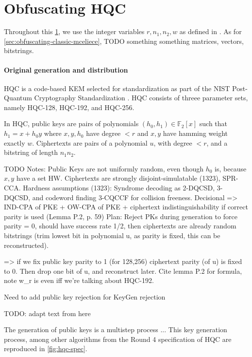 \section{Obfuscating HQC} \label{sec:obfuscating-hqc}

Throughout this \cref{sec:obfuscating-hqc}, we use the integer variables $r, n_1, n_2, w$ as defined in \cite{NISTPQC-R4:HQC22}.
As for \cref{sec:obfuscating-classic-mceliece}, TODO something something matrices, vectors, bitstrings.

\paragraph{Original generation and distribution}
HQC is a code-based KEM selected for standardization as part of the NIST Post-Quantum Cryptography Standardization \cite{nist-standardization,nist-ir-8545}. HQC consists of threee parameter sets, namely HQC-128, HQC-192, and HQC-256.
 
In HQC, public keys are pairs of polynomials $(h_0, h_1) \in \mathbb{F}_2[x]$ such that $h_1 = x + h_0 y$ where $x,y,h_0$ have degree $<r$ and $x,y$ have hamming weight exactly $w$.
Ciphertexts are pairs of a polynomial $u$, with degree $<r$, and a bitstring of length $n_1n_2$.

TODO Notes:
Public Keys are not uniformly random, even though $h_0$ is, because $x,y$ have a set HW.
Ciphertexts are strongly disjoint-simulatable (1323), SPR-CCA.
Hardness assumptions (1323): Syndrome decoding as 2-DQCSD, 3-DQCSD, and codeword finding 3-CQCCF for collision freeness. Decisional => IND-CPA of PKE + OW-CPA of PKE + ciphertext indistinguishability if correct parity is used (Lemma P.2, p. 59)
Plan: Reject PKs during generation to force parity = 0, should have success rate 1/2, then ciphertexts are already random bitstrings (trim lowest bit in polynomial u, as parity is fixed, this can be reconstructed).

=> if we fix public key parity to 1 (for 128,256) ciphertext parity (of u) is fixed to 0. Then drop one bit of u, and reconstruct later. Cite lemma P.2 for formula, note w_r is even iff we're talking about HQC-192.

Need to add public key rejection for KeyGen rejection

\newpage
TODO: adapt text from here

The generation of public keys is a multistep process ...
This key generation process, among other algorithms from the Round 4 specification of HQC are reproduced in \cref{fig:hqc-spec}.

